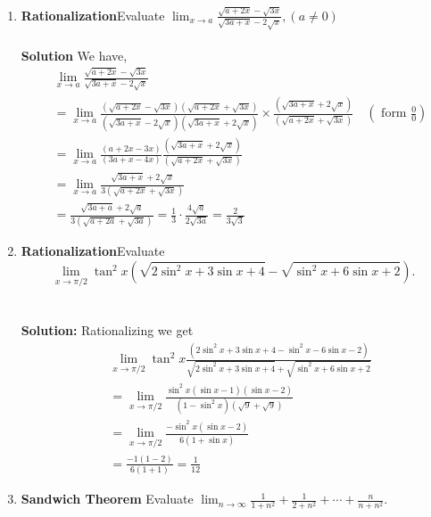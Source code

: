 \begin{enumerate}
\item \textbf{Rationalization}Evaluate $\lim _{x \rightarrow a} \frac{\sqrt{a+2 x}-\sqrt{3 x}}{\sqrt{3 a+x}-2 \sqrt{x}},(a \neq 0)$\\\\

\textbf{Solution}
We have,
$$
\begin{aligned}
& \lim _{x \rightarrow a} \frac{\sqrt{a+2 x}-\sqrt{3 x}}{\sqrt{3 a+x}-2 \sqrt{x}} \\
& =\lim _{x \rightarrow a} \frac{(\sqrt{a+2 x}-\sqrt{3 x})(\sqrt{a+2 x}+\sqrt{3 x})}{(\sqrt{3 a+x}-2 \sqrt{x})(\sqrt{3 a+x}+2 \sqrt{x})}  \times \frac{(\sqrt{3 a+x}+2 \sqrt{x})}{(\sqrt{a+2 x}+\sqrt{3 x})} \quad\left(\text { form } \frac{0}{0}\right) \\
& =\lim _{x \rightarrow a} \frac{(a+2 x-3 x)}{(3 a+x-4 x)} \frac{(\sqrt{3 a+x}+2 \sqrt{x})}{(\sqrt{a+2 x}+\sqrt{3 x})} \\
& =\lim _{x \rightarrow a} \frac{\sqrt{3 a+x}+2 \sqrt{x}}{3(\sqrt{a+2 x}+\sqrt{3 x})} \\
& =\frac{\sqrt{3 a+a}+2 \sqrt{a}}{3(\sqrt{a+2 a}+\sqrt{3 a})}=\frac{1}{3} \cdot \frac{4 \sqrt{a}}{2 \sqrt{3 a}}=\frac{2}{3 \sqrt{3}}
\end{aligned}
$$

\item 
\textbf{Rationalization}Evaluate
$$
\lim _{x \rightarrow \pi / 2} \tan ^2 x\left(\sqrt{2 \sin ^2 x+3 \sin x+4}-\sqrt{\sin ^2 x+6 \sin x+2}\right) \text {. }
$$\\\\

\textbf{Solution:} Rationalizing we get
$$
\begin{aligned}
& \lim _{x \rightarrow \pi / 2} \tan ^2 x \frac{\left(2 \sin ^2 x+3 \sin x+4-\sin ^2 x-6 \sin x-2\right)}{\sqrt{2 \sin ^2 x+3 \sin x+4}+\sqrt{\sin ^2 x+6 \sin x+2}} \\
& =\lim _{x \rightarrow \pi / 2} \frac{\sin ^2 x(\sin x-1)(\sin x-2)}{\left(1-\sin ^2 x\right)(\sqrt{9}+\sqrt{9})} \\
& =\lim _{x \rightarrow \pi / 2} \frac{-\sin ^2 x(\sin x-2)}{6(1+\sin x)} \\
& =\frac{-1(1-2)}{6(1+1)}=\frac{1}{12}
\end{aligned}$$




\item \textbf{Sandwich Theorem}
Evaluate $\lim _{n \rightarrow \infty} \frac{1}{1+n^2}+\frac{1}{2+n^2}+\cdots+\frac{n}{n+n^2}$.\\\\


\end{enumerate}
